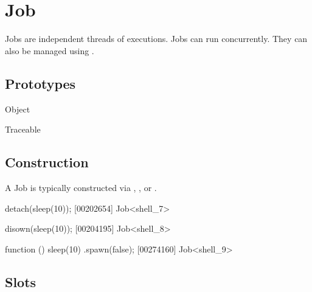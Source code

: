 
\section{Job}

Jobs are independent threads of executions.  Jobs can run concurrently.
They can also be managed using .

\subsection{Prototypes}

\begin{refObjects}
\item[Object]
\item[Traceable]
\end{refObjects}

\subsection{Construction}

A Job is typically constructed via ,
, or .

\begin{urbiscript}
detach(sleep(10));
[00202654] Job<shell_7>

disown(sleep(10));
[00204195] Job<shell_8>

function () { sleep(10) }.spawn(false);
[00274160] Job<shell_9>
\end{urbiscript}

\subsection{Slots}

